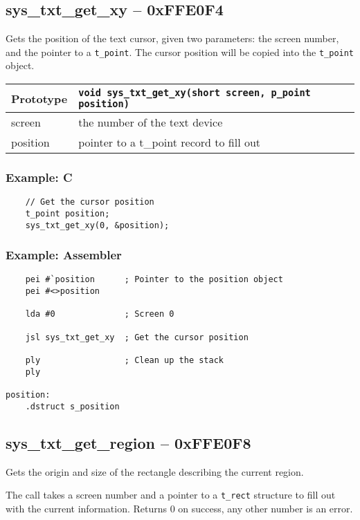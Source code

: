 \subsection*{sys\_txt\_get\_xy -- 0xFFE0F4}
Gets the position of the text cursor, given two parameters: the screen number, and the pointer to a \verb+t_point+.
The cursor position will be copied into the \verb+t_point+ object.

\bigskip

\begin{tabular}{|l||l|} \hline
Prototype & \lstinline!void sys_txt_get_xy(short screen, p_point position)! \\ \hline
screen & the number of the text device \\ \hline
position & pointer to a t\_point record to fill out \\ \hline
\end{tabular}

\subsubsection*{Example: C}
\begin{lstlisting}
    // Get the cursor position
    t_point position;
    sys_txt_get_xy(0, &position);
\end{lstlisting}

\subsubsection*{Example: Assembler}
\begin{verbatim}
    pei #`position      ; Pointer to the position object
    pei #<>position

    lda #0              ; Screen 0

    jsl sys_txt_get_xy  ; Get the cursor position

    ply                 ; Clean up the stack
    ply

position:
    .dstruct s_position
\end{verbatim}


\subsection*{sys\_txt\_get\_region -- 0xFFE0F8}
Gets the origin and size of the rectangle describing the current region.

The call takes a screen number and a pointer to a \verb+t_rect+ structure to fill out with the current information. Returns 0 on success, any other number is an error.

